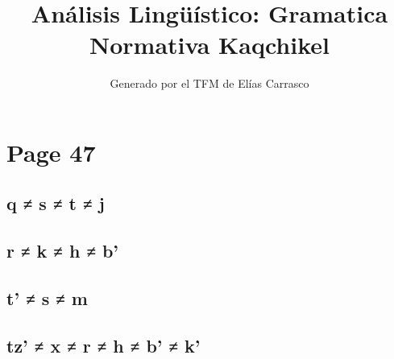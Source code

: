 \documentclass{article}%
\title{Análisis Lingüístico: Gramatica Normativa Kaqchikel}%
\author{Generado por el TFM de Elías Carrasco}%
\begin{document}
%
\normalsize%
\maketitle%
\section{Page 47}%
\label{sec:Page47}%
\subsection{q ≠ s ≠ t ≠ j}%
\label{subsec:qstj}%

%
\subsection{r ≠ k ≠ h ≠ b'}%
\label{subsec:rkhb}%

%
\subsection{t' ≠ s ≠ m}%
\label{subsec:tsm}%

%
\subsection{tz' ≠ x ≠ r ≠ h ≠ b' ≠ k'}%
\label{subsec:tzxrhbk}%

%
\end{document}
